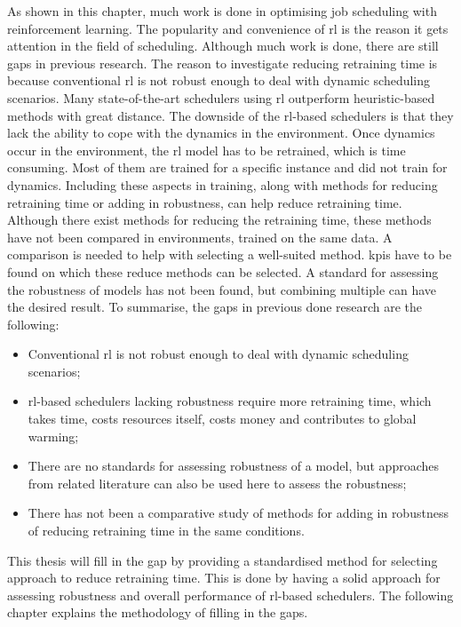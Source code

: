 As shown in this chapter, much work is done in optimising job scheduling with
reinforcement learning. The popularity and convenience of \gls{rl} is the
reason it gets attention in the field of scheduling. Although much work is
done, there are still gaps in previous research. The reason to investigate
reducing retraining time is because conventional \gls{rl} is not robust enough
to deal with dynamic scheduling scenarios. Many state-of-the-art schedulers
using \gls{rl} outperform heuristic-based methods with great distance. The
downside of the \gls{rl}-based schedulers is that they lack the ability to
cope with the dynamics in the environment. Once dynamics occur in the
environment, the \gls{rl} model has to be retrained, which is time consuming.
Most of them are trained for a specific instance and did not train for
dynamics. Including these aspects in training, along with methods for reducing
retraining time or adding in robustness, can help reduce retraining time.
Although there exist methods for reducing the retraining time, these methods
have not been compared in \jss environments, trained on the same data. A
comparison is needed to help with selecting a well-suited method. \glspl{kpi}
have to be found on which these reduce methods can be selected. A standard for
assessing the robustness of models has not been found, but combining multiple
can have the desired result. To summarise, the gaps in previous done research are the
following:
\begin{itemize}[noitemsep]
    \item Conventional \gls{rl} is not robust enough to deal with dynamic
        scheduling scenarios;
    \item \gls{rl}-based schedulers lacking robustness require more retraining time,
        which takes time, costs resources itself, costs money and contributes
        to global warming;
    \item There are no standards for assessing robustness of a model, but
        approaches from related literature can also be used here to assess
        the robustness;
    \item There has not been a comparative study of methods for adding in
        robustness of reducing retraining time in the same conditions.
\end{itemize}
This thesis will fill in the gap by providing a standardised method for
selecting approach to reduce retraining time. This is done by having a solid
approach for assessing robustness and overall performance of \gls{rl}-based
schedulers. The following chapter explains the methodology of filling in the
gaps.
